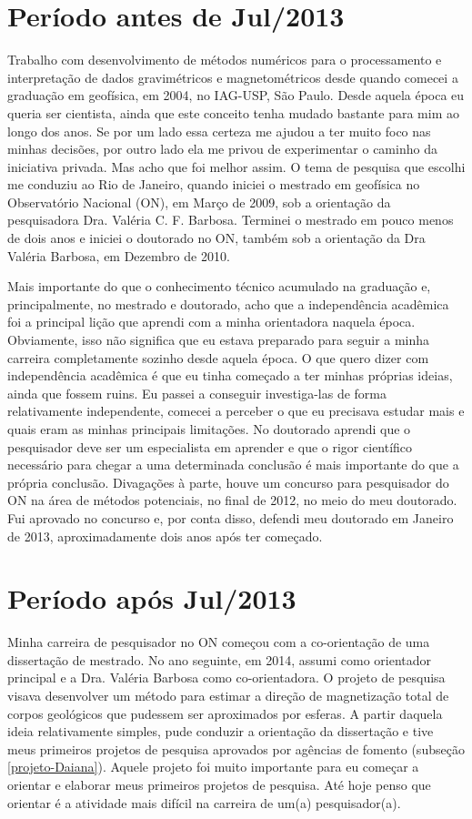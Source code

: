 \section*{Período antes de Jul/2013}


Trabalho com desenvolvimento de métodos numéricos para o processamento e
interpretação de dados gravimétricos e magnetométricos desde quando comecei
a graduação em geofísica, em 2004, no IAG-USP, São Paulo.
Desde aquela época eu queria ser cientista, ainda que este conceito tenha mudado 
bastante para mim ao longo dos anos. Se por um lado essa certeza me ajudou a 
ter muito foco nas minhas decisões, por outro lado ela me privou de experimentar
o caminho da iniciativa privada. Mas acho que foi melhor assim.
O tema de pesquisa que escolhi me conduziu ao Rio de Janeiro, quando iniciei 
o mestrado em geofísica no Observatório Nacional (ON), em Março de 2009, sob 
a orientação da pesquisadora Dra. Valéria C. F. Barbosa. 
Terminei o mestrado em pouco menos de dois anos e iniciei o doutorado no ON, 
também sob a orientação da Dra Valéria Barbosa, em Dezembro de 2010.

Mais importante do que o conhecimento técnico acumulado na graduação e, 
principalmente, no mestrado e doutorado, acho que a independência acadêmica 
foi a principal lição que aprendi com a minha orientadora naquela época.
Obviamente, isso não significa que eu estava preparado para seguir a minha 
carreira completamente sozinho desde aquela época. O que quero dizer com 
independência acadêmica é que eu tinha começado a ter minhas próprias ideias,
ainda que fossem ruins. Eu passei a conseguir investiga-las de forma 
relativamente independente, comecei a perceber o que eu precisava estudar 
mais e quais eram as minhas principais limitações.
No doutorado aprendi que o pesquisador deve ser um especialista em aprender
e que o rigor científico necessário para chegar a uma determinada conclusão é 
mais importante do que a própria conclusão.
Divagações à parte, houve um concurso para pesquisador do ON na área de métodos 
potenciais, no final de 2012, no meio do meu doutorado. Fui aprovado no concurso
e, por conta disso, defendi meu doutorado em Janeiro de 2013, aproximadamente dois 
anos após ter começado.


\section*{Período após Jul/2013}


Minha carreira de pesquisador no ON começou com a co-orientação 
de uma dissertação de mestrado. No ano seguinte, em 2014, assumi como orientador 
principal e a Dra. Valéria Barbosa como co-orientadora. 
O projeto de pesquisa visava desenvolver um método para estimar 
a direção de magnetização total de corpos geológicos que pudessem ser aproximados
por esferas. A partir daquela ideia relativamente simples, pude conduzir a orientação da 
dissertação e tive meus primeiros projetos de pesquisa aprovados por agências de fomento 
(subseção \ref{projeto-Daiana}). Aquele projeto foi muito importante para eu começar a 
orientar e elaborar meus primeiros projetos de pesquisa. Até hoje penso que orientar 
é a atividade mais difícil na carreira de um(a) pesquisador(a).

